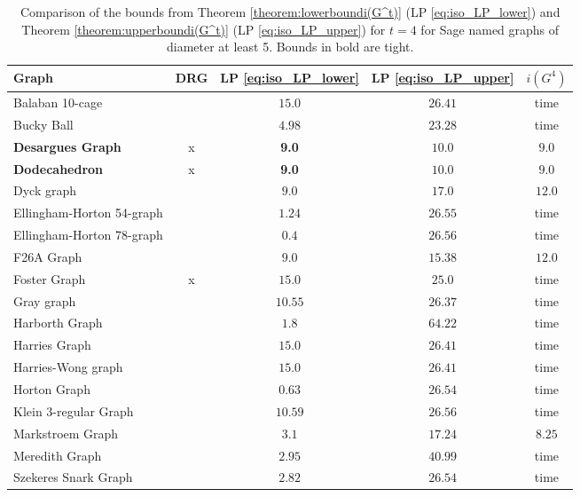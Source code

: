\documentclass[a4paper,11pt]{article}
\theoremstyle{definition}
\begin{document}
\begin{table}[H]
    \centering
    \begin{tabular}{l|c|cc|c}
    Graph & DRG & LP \eqref{eq:iso_LP_lower}& LP \eqref{eq:iso_LP_upper} & $i(G^4)$ \\
    \hline
    Balaban 10-cage &  & $15.0$ & $26.41$ & time \\
    Bucky Ball &  & $4.98$ & $23.28$ & time \\
    \textbf{Desargues Graph} & x & \textbf{9.0} & $10.0$ & $9.0$ \\
    \textbf{Dodecahedron} & x & \textbf{9.0} & $10.0$ & $9.0$ \\
    Dyck graph &  & $9.0$ & $17.0$ & $12.0$ \\
    Ellingham-Horton 54-graph &  & $1.24$ & $26.55$ & time \\
    Ellingham-Horton 78-graph &  & $0.4$ & $26.56$ & time \\
    F26A Graph &  & $9.0$ & $15.38$ & $12.0$ \\
    Foster Graph & x & $15.0$ & $25.0$ & time \\
    Gray graph &  & $10.55$ & $26.37$ & time \\
    Harborth Graph &  & $1.8$ & $64.22$ & time \\
    Harries Graph &  & $15.0$ & $26.41$ & time \\
    Harries-Wong graph &  & $15.0$ & $26.41$ & time \\
    Horton Graph &  & $0.63$ & $26.54$ & time \\
    Klein 3-regular Graph &  & $10.59$ & $26.56$ & time \\
    Markstroem Graph &  & $3.1$ & $17.24$ & $8.25$ \\
    Meredith Graph &  & $2.95$ & $40.99$ & time \\
    Szekeres Snark Graph &  & $2.82$ & $26.54$ & time \\
        \end{tabular}
    \caption{Comparison of the bounds from Theorem \ref{theorem:lowerboundi(G^t)} (LP \eqref{eq:iso_LP_lower}) and Theorem \ref{theorem:upperboundi(G^t)} (LP \eqref{eq:iso_LP_upper}) for $t=4$ for Sage named graphs of diameter at least 5. Bounds in bold are tight.}
    \label{tab:t4_sim}
\end{table}

\newpage
\end{document}
